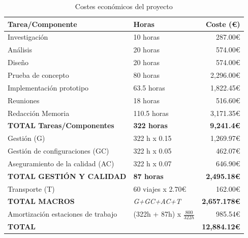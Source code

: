 \begin{table}[!h]
\centering
\bgroup
\def\arraystretch{1.3}
\begin{tabular}{l p{120pt} r}
\toprule
\textbf{Tarea/Componente} & \textbf{Horas} & \textbf{Coste (€)} \\
 \midrule
 Investigación
& 
10 horas
& 
287.00€
 \\
 Análisis
& 
20 horas
& 
574.00€
 \\
 Diseño
& 
20 horas
& 
574.00€
 \\
 Prueba de concepto
& 
80 horas
& 
2,296.00€
 \\
 Implementación prototipo
& 
63.5 horas
&
1,822.45€
 \\
 Reuniones
& 
18 horas
& 
516.60€
 \\
 Redacción Memoria
& 
110.5 horas
& 
3,171.35€
 \\
 \textbf{TOTAL Tareas/Componentes}
& 
\textbf{322 horas}
& 
\textbf{9,241.4€}
 \\
 \hline
 Gestión (G)
& 
322 h x 0.15
& 
1,269.97€
 \\
 Gestión de configuraciones (GC)
& 
322 h x 0.05
& 
462.07€
 \\
 Aseguramiento de la calidad (AC)
& 
322 h x 0.07
& 
646.90€
 \\
 \textbf{TOTAL GESTIÓN Y CALIDAD}
& 
\textbf{87 horas}
& 
\textbf{2,495.18€}
 \\
 \hline
 Transporte (T)
& 
60 viajes x 2.70€
& 
162.00€
 \\
 \textbf{TOTAL MACROS}
& 
\textit{G+GC+AC+T}
& 
\textbf{2,657.178€}
 \\
 \hline
 Amortización estaciones de trabajo
& 
(322h + 87h) x \( \frac{800}{322 h} \)
& 
985.54€
 \\
 \textbf{TOTAL}
& 
& 
\textbf{12,884.12€}
 \\
\bottomrule
\end{tabular}
\egroup
\caption{Costes económicos del proyecto}
\label{tab:costeproyecto}
\end{table}
 